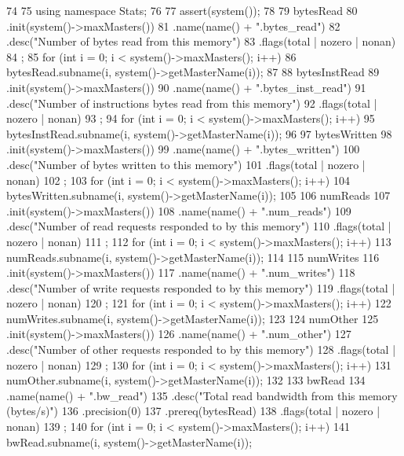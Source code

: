 \begin{DoxyCode}
74 {
75     using namespace Stats;
76 
77     assert(system());
78 
79     bytesRead
80         .init(system()->maxMasters())
81         .name(name() + ".bytes_read")
82         .desc("Number of bytes read from this memory")
83         .flags(total | nozero | nonan)
84         ;
85     for (int i = 0; i < system()->maxMasters(); i++) {
86         bytesRead.subname(i, system()->getMasterName(i));
87     }
88     bytesInstRead
89         .init(system()->maxMasters())
90         .name(name() + ".bytes_inst_read")
91         .desc("Number of instructions bytes read from this memory")
92         .flags(total | nozero | nonan)
93         ;
94     for (int i = 0; i < system()->maxMasters(); i++) {
95         bytesInstRead.subname(i, system()->getMasterName(i));
96     }
97     bytesWritten
98         .init(system()->maxMasters())
99         .name(name() + ".bytes_written")
100         .desc("Number of bytes written to this memory")
101         .flags(total | nozero | nonan)
102         ;
103     for (int i = 0; i < system()->maxMasters(); i++) {
104         bytesWritten.subname(i, system()->getMasterName(i));
105     }
106     numReads
107         .init(system()->maxMasters())
108         .name(name() + ".num_reads")
109         .desc("Number of read requests responded to by this memory")
110         .flags(total | nozero | nonan)
111         ;
112     for (int i = 0; i < system()->maxMasters(); i++) {
113         numReads.subname(i, system()->getMasterName(i));
114     }
115     numWrites
116         .init(system()->maxMasters())
117         .name(name() + ".num_writes")
118         .desc("Number of write requests responded to by this memory")
119         .flags(total | nozero | nonan)
120         ;
121     for (int i = 0; i < system()->maxMasters(); i++) {
122         numWrites.subname(i, system()->getMasterName(i));
123     }
124     numOther
125         .init(system()->maxMasters())
126         .name(name() + ".num_other")
127         .desc("Number of other requests responded to by this memory")
128         .flags(total | nozero | nonan)
129         ;
130     for (int i = 0; i < system()->maxMasters(); i++) {
131         numOther.subname(i, system()->getMasterName(i));
132     }
133     bwRead
134         .name(name() + ".bw_read")
135         .desc("Total read bandwidth from this memory (bytes/s)")
136         .precision(0)
137         .prereq(bytesRead)
138         .flags(total | nozero | nonan)
139         ;
140     for (int i = 0; i < system()->maxMasters(); i++) {
141         bwRead.subname(i, system()->getMasterName(i));
}}
\end{DoxyCode}

